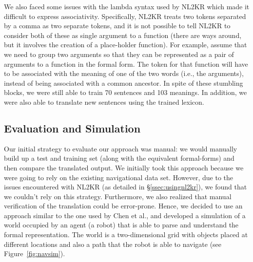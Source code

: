 \documentclass[11pt,letterpaper]{article}
\begin{document}
We also faced some issues with the lambda syntax used by NL2KR which made it difficult to express associativity. Specifically, NL2KR treats two tokens separated by a comma as two separate tokens, and it is not possible to tell NL2KR to consider both of these as single argument to a function (there are ways around, but it involves the creation of a place-holder function). For example, assume that we need to group two arguments so that they can be represented as a pair of arguments to a function in the formal form. The token for that function will have to be associated with the meaning of one of the two words (i.e., the arguments), instead of being associated with a common ancestor. In spite of these stumbling blocks, we were still able to train 70 sentences and 103 meanings. In addition, we were also able to translate new sentences using the trained lexicon.

\subsection{Evaluation and Simulation}

Our initial strategy to evaluate our approach was manual: we would manually build up a test and training set (along with the equivalent formal-forms) and then compare the translated output. We initially took this approach because we were going to rely on the existing navigational data set. However, due to the issues encountered with NL2KR (as detailed in \S\ref{ssec:usingnl2kr}), we found that we couldn't rely on this strategy. Furthermore, we also realized that manual verification of the translation could be error-prone. Hence, we decided to use an approach similar to the one used by Chen et al., and developed a simulation of a world occupied by an agent (a robot) that is able to parse and understand the formal representation. The world is a two-dimensional grid with objects placed at different locations and also a path that the robot is able to navigate (see Figure~\ref{fig:navsim}).
\end{document}
